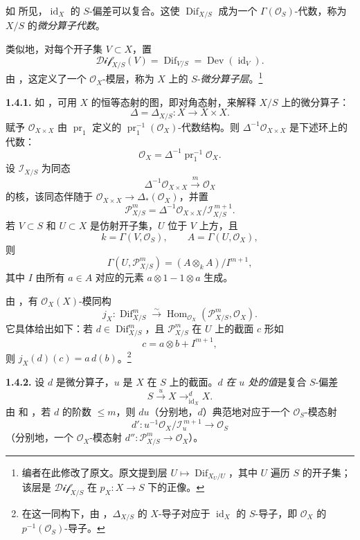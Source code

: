 如  所见，\(\operatorname{id}_X\) 的 \(S\)-偏差可以复合。这使 \(\operatorname{Dif}_{X/S}\) 成为一个 \(\Gamma(\mathcal O_S)\)-代数，称为 \(X/S\) 的\emph{微分算子代数}。

类似地，对每个开子集 \(V\subset X\)，置
\[
 \mathcal{Dif}_{X/S}(V)
 =\operatorname{Dif}_{V/S}
 =\operatorname{Dev}(\operatorname{id}_V).
\]
由 ，这定义了一个 \(\mathcal O_X\)-模层，称为 \(X\) 上的 \(S\)-\emph{微分算子层}。\footnote{编者在此修改了原文。原文提到层 \(U\mapsto\operatorname{Dif}_{X_U/U}\)，其中 \(U\) 遍历 \(S\) 的开子集；该层是 \(\mathcal{Dif}_{X/S}\) 在 \(p_X:X\to S\) 下的正像。}

\medskip
\noindent\textbf{1.4.1.}
\label{sga3:VIIA:1.4.1}
如 ，可用 \(X\) 的恒等态射的图，即对角态射，来解释 \(X/S\) 上的微分算子：
\[
  \Delta=\Delta_{X/S}:X\longrightarrow X\times X.
\]
赋予 \(\mathcal O_{X\times X}\) 由 \(\operatorname{pr}_1\) 定义的 \(\operatorname{pr}_1^{-1}(\mathcal O_X)\)-代数结构。则 \(\Delta^{-1}\mathcal O_{X\times X}\) 是下述环上的代数：
\[
  \mathcal O_X=\Delta^{-1}\operatorname{pr}_1^{-1}\mathcal O_X.
\]
设 \(\mathcal I_{X/S}\) 为同态
\[
 \Delta^{-1}\mathcal O_{X\times X}
 \xrightarrow{m}
 \mathcal O_X
\]
的核，该同态伴随于 \(\mathcal O_{X\times X}\to\Delta_*(\mathcal O_X)\)，并置
\[
  \mathcal P^m_{X/S}
  =
  \Delta^{-1}\mathcal O_{X\times X}/\mathcal I_{X/S}^{\,m+1}.
\]
若 \(V\subset S\) 和 \(U\subset X\) 是仿射开子集，\(U\) 位于 \(V\) 上方，且
\[
  k=\Gamma(V,\mathcal O_S),
  \qquad
  A=\Gamma(U,\mathcal O_X),
\]
则
\[
  \Gamma(U,\mathcal P^m_{X/S})
  =(A\otimes_kA)/I^{m+1},
\]
其中 \(I\) 由所有 \(a\in A\) 对应的元素 \(a\otimes1-1\otimes a\) 生成。

由 ，有 \(\mathcal O_X(X)\)-模同构
\[
 j_X:\operatorname{Dif}^m_{X/S}
 \xrightarrow{\sim}
 \operatorname{Hom}_{\mathcal O_X}
   (\mathcal P^m_{X/S},\mathcal O_X).
\]
它具体给出如下：若 \(d\in\operatorname{Dif}^m_{X/S}\)，且 \(\mathcal P^m_{X/S}\) 在 \(U\) 上的截面 \(c\) 形如
\[
  c=a\otimes b+I^{m+1},
\]
则 \(j_X(d)(c)=a\,d(b)\)。\footnote{在这一同构下，由 ，\(\Delta_{X/S}\) 的 \(X\)-导子对应于 \(\operatorname{id}_X\) 的 \(S\)-导子，即 \(\mathcal O_X\) 的 \(p^{-1}(\mathcal O_S)\)-导子。}

\medskip
\noindent\textbf{1.4.2.}
\label{sga3:VIIA:1.4.2}
设 \(d\) 是微分算子，\(u\) 是 \(X\) 在 \(S\) 上的截面。\(d\) \emph{在 \(u\) 处的值}是复合 \(S\)-偏差
\[
  S\xrightarrow{u}X
  \mathop{\longrightarrow}^{d}_{\operatorname{id}_X}X.
\]
由  和 ，若 \(d\) 的阶数 \(\leq m\)，则 \(du\)（分别地，\(d\)）典范地对应于一个 \(\mathcal O_S\)-模态射
\[
 d':u^{-1}\mathcal O_X/\mathcal I_u^{\,m+1}\longrightarrow\mathcal O_S
\]
（分别地，一个 \(\mathcal O_X\)-模态射 \(d'':\mathcal P^m_{X/S}\to\mathcal O_X\)）。

